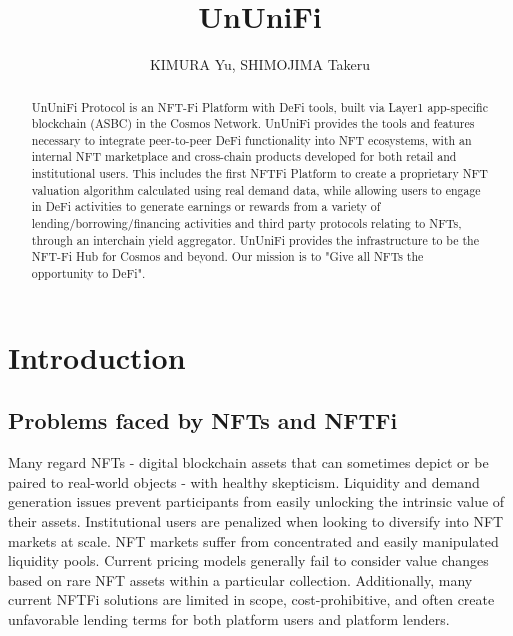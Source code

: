 \documentclass[dvipdfmx]{jsarticle}
\title{UnUniFi}
\author{KIMURA Yu, SHIMOJIMA Takeru}
\begin{document}

\maketitle

\begin{abstract}
  UnUniFi Protocol is an NFT-Fi Platform with DeFi tools, built via Layer1 app-specific blockchain (ASBC) in the Cosmos Network. 
  UnUniFi provides the tools and features necessary to integrate peer-to-peer DeFi functionality into NFT ecosystems, with an internal NFT marketplace and cross-chain products developed for both retail and institutional users. 
  This includes the first NFTFi Platform to create a proprietary NFT valuation algorithm calculated using real demand data, while allowing users to engage in DeFi activities to generate earnings or rewards from a variety of lending/borrowing/financing activities and third party protocols relating to NFTs, through an interchain yield aggregator. 
  UnUniFi provides the infrastructure to be the NFT-Fi Hub for Cosmos and beyond. 
  Our mission is to "Give all NFTs the opportunity to DeFi".
\end{abstract}

\section{Introduction}

\subsection{Problems faced by NFTs and NFTFi}
Many regard NFTs - digital blockchain assets that can sometimes depict or be paired to real-world objects - with healthy skepticism. 
Liquidity and demand generation issues prevent participants from easily unlocking the intrinsic value of their assets. 
Institutional users are penalized when looking to diversify into NFT markets at scale. 
NFT markets suffer from concentrated and easily manipulated liquidity pools. 
Current pricing models generally fail to consider value changes based on rare NFT assets within a particular collection. 
Additionally, many current NFTFi solutions are limited in scope, cost-prohibitive, and often create unfavorable lending terms for both platform users and platform lenders.
\end{document}
